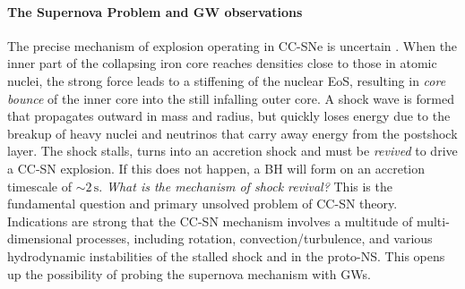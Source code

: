 \paragraph{The Supernova Problem and GW observations}
The precise mechanism of explosion operating in CC-SNe is uncertain
\cite{bethe:90,janka:07,ott:09}. When the inner part of the collapsing
iron core reaches densities close to those in atomic nuclei, the
strong force leads to a stiffening of the nuclear EoS,
resulting in \emph{core bounce} of the inner core into the still
infalling outer core. A shock wave is formed that propagates outward
in mass and radius, but quickly loses energy due to the breakup of
heavy nuclei and neutrinos that carry away energy from the
postshock layer. The shock stalls, turns into an accretion shock and
must be \emph{revived} to drive a CC-SN explosion.  If this does not
happen, a BH will form on an accretion timescale of $\sim
2\,\mathrm{s}$. \emph{What is the mechanism of shock revival?}  This
is the fundamental question and primary unsolved problem of CC-SN
theory. Indications are strong that the CC-SN mechanism involves a
multitude of multi-dimensional processes, including rotation,
convection/turbulence, and various hydrodynamic instabilities of the
stalled shock and in the proto-NS. This opens up the possibility of
probing the supernova mechanism with GWs. 


